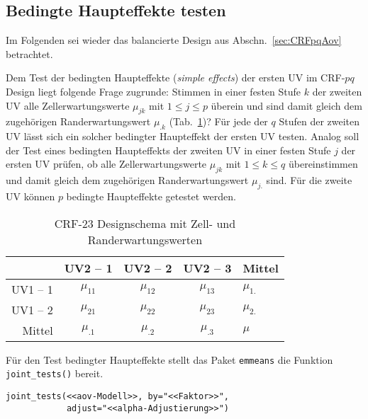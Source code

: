 \subsection{Bedingte Haupteffekte testen}
\label{sec:simpleEffects}

Im Folgenden sei wieder das balancierte Design aus Abschn.\ \ref{sec:CRFpqAov} betrachtet.

Dem Test der bedingten Haupteffekte (\emph{simple effects}) der ersten UV im CRF-$pq$ Design liegt folgende Frage zugrunde: Stimmen in einer festen Stufe $k$ der zweiten UV alle Zellerwartungswerte $\mu_{jk}$ mit $1 \leq j \leq p$ überein und sind damit gleich dem zugehörigen Randerwartungswert $\mu_{.k}$ (Tab.\ \ref{tab:CRF23})? Für jede der $q$ Stufen der zweiten UV lässt sich ein solcher bedingter Haupteffekt der ersten UV testen. Analog soll der Test eines bedingten Haupteffekts der zweiten UV in einer festen Stufe $j$ der ersten UV prüfen, ob alle Zellerwartungswerte $\mu_{jk}$ mit $1 \leq k \leq q$ übereinstimmen und damit gleich dem zugehörigen Randerwartungswert $\mu_{j.}$ sind. Für die zweite UV können $p$ bedingte Haupteffekte getestet werden.

\begin{table}[ht]
\centering
\caption{CRF-$23$ Designschema mit Zell- und Randerwartungswerten}
\label{tab:CRF23}
\begin{tabular}{rcccl}
\hline
~ & \sffamily UV2 -- 1 & \sffamily UV2 -- 2 & \sffamily UV2 -- 3 &
\sffamily Mittel\\\hline\hline
\sffamily UV1 -- 1 & $\mu_{11}$ & $\mu_{12}$ & $\mu_{13}$ & $\mu_{1.}$\\
\sffamily UV1 -- 2 & $\mu_{21}$ & $\mu_{22}$ & $\mu_{23}$ & $\mu_{2.}$\\
\sffamily Mittel   & $\mu_{.1}$ & $\mu_{.2}$ & $\mu_{.3}$ & $\mu$\\\hline
\end{tabular}
\end{table}

Für den Test bedingter Haupteffekte stellt das Paket \lstinline!emmeans! die Funktion \lstinline!joint_tests()! bereit.
\begin{lstlisting}
joint_tests(<<aov-Modell>>, by="<<Faktor>>",
            adjust="<<alpha-Adjustierung>>")
\end{lstlisting}

